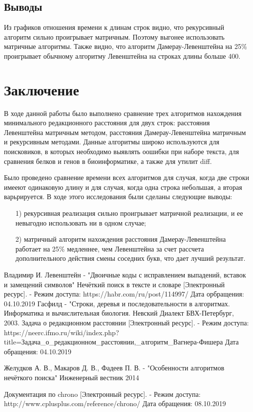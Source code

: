 \documentclass[a4paper,12pt]{article}
\newcommand{\anonsection}[1]{\section*{#1}\addcontentsline{toc}{section}{#1}}
\begin{document}
\subsection{Выводы}

Из графиков отношения времени к длинам строк видно, что рекурсивный
алгоритм сильно проигрывает матричным. Поэтому выгонее использовать
матричные алгоритмы. Также видно, что алгоритм Дамерау-Левенштейна на 25\%
проигрывает обычному алгоритму Левенштейна на строках длины больше 400.

\newpage
\anonsection{Заключение}

В ходе данной работы было выполнено сравнение трех алгоритмов нахождения минимального редакционного расстояния для двух строк: расстояния Левенштейна матричным методом, расстояния Дамерау-Левенштейна матричным и рекурсивным методами. Данные алгоритмы широко используются для поисковиков, в которых необходимо выявлять оошибки при наборе текста, для сравнения белков и генов в биоинформатике, а также для утилит diff.

Было проведено сравнение времени всех алгоритмов для случая, когда две строки имееют одинаковую длину и для случая, когда одна строка небольшая, а вторая варьрируется. В ходе этого исследования были сделаны следующие выводы:

\begin{enumerate}
    \item[1)] рекурсивная реализация сильно проигрывает матричной реализации, и ее невыгодно использовать ни в одном случае;
    \item[2)] матричный алгоритм нахождения расстояния Дамерау-Левенштейна работает на 25\% медленнее, чем Левенштейна за счет рассчета дополнительного действия смены соседних букв, что дает лучший результат.
\end{enumerate}

\newpage
{}

\begin{thebibliography}{}
     Владимир И. Левенштейн - "Двоичные коды с исправлением выпадений, вставок и замещений символов"
     Нечёткий поиск в тексте и словаре [Электронный ресурс]. - Режим доступа: https://habr.com/ru/post/114997/ Дата орбращения: 04.10.2019
     Гасфилд - "Строки, деревья и последовательности в алгоритмах. Информатика и вычислительная биология. Невский Диалект БВХ-Петербург, 2003.
     Задача о редакционном расстоянии [Электронный ресурс]. - Режим доступа: https://neerc.ifmo.ru/wiki/index.php?title=Задача\_о\_редакционном\_расстоянии,\_алгоритм\_Вагнера-Фишера Дата обращения: 04.10.2019

     Желудков А. В., Макаров Д. В., Фадеев П. В. - "Особенности алгоритмов нечёткого поиска" Инженерный вестник 2014

     Документация по chrono [Электронный ресурс]. -  Режим доступа: http://www.cplusplus.com/reference/chrono/ Дата обращения: 08.10.2019
\end{thebibliography}
\end{document}
